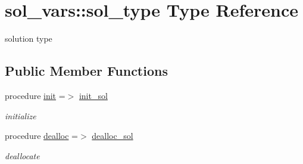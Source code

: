 \hypertarget{structsol__vars_1_1sol__type}{}\section{sol\+\_\+vars\+:\+:sol\+\_\+type Type Reference}
\label{structsol__vars_1_1sol__type}


solution type  


\subsection*{Public Member Functions}
\begin{DoxyCompactItemize}
\item 
procedure \hyperlink{structsol__vars_1_1sol__type_a0963ae0c30f925b509a5da7e624ace84}{init} =$>$ \hyperlink{namespacesol__vars_a05d1378774a44f53c9643bdacc5bee4a}{init\+\_\+sol}
\begin{DoxyCompactList}\small\item\em initialize \end{DoxyCompactList}\item 
procedure \hyperlink{structsol__vars_1_1sol__type_a0501ba6efed7b97dcc3762a788caf826}{dealloc} =$>$ \hyperlink{namespacesol__vars_a9ae65a5252aede548e5238e50c1bb2ba}{dealloc\+\_\+sol}
\begin{DoxyCompactList}\small\item\em deallocate \end{DoxyCompactList}\end{DoxyCompactItemize}
